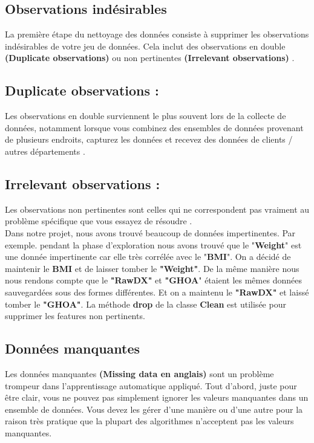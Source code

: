 \documentclass[12pt, french]{report}
\begin{document}
\subsection{Observations indésirables} La première étape du nettoyage des données consiste à supprimer les observations indésirables de votre jeu de données. Cela inclut des observations en double \textbf{(Duplicate observations)} ou non pertinentes \textbf{(Irrelevant observations)} \cite{key21}.

\subsection{Duplicate observations :} Les observations en double surviennent le plus souvent lors de la collecte de données, notamment lorsque vous combinez des ensembles de données provenant de plusieurs endroits, capturez les données et recevez des données de clients / autres départements \cite{key21}.

\subsection{Irrelevant observations :} Les observations non pertinentes sont celles qui ne correspondent pas vraiment au problème spécifique que vous essayez de résoudre \cite{key21}. \\

Dans notre projet, nous avons trouvé beaucoup de données impertinentes. Par exemple. pendant la phase d'exploration nous avons trouvé que le "\textbf{Weight}" est une donnée impertinente car elle très corrélée avec le "\textbf{BMI}". On a décidé de maintenir le \textbf{BMI} et de laisser tomber le \textbf{"Weight"}.  De la même manière nous nous rendons compte que le \textbf{"RawDX"} et \textbf{"GHOA}" étaient les mêmes données sauvegardées sous des formes différentes. Et on a maintenu le \textbf{"RawDX"} et laissé tomber le \textbf{"GHOA"}. La méthode \textbf{drop} de la classe \textbf{Clean} est utilisée pour supprimer les features non pertinents.  

\subsection{Données manquantes}
Les données manquantes \textbf{(Missing data en anglais)} sont un problème trompeur dans l'apprentissage automatique appliqué. Tout d'abord, juste pour être clair, vous ne pouvez pas simplement ignorer les valeurs manquantes dans un ensemble de données. Vous devez les gérer d'une manière ou d'une autre pour la raison très pratique que la plupart des algorithmes n'acceptent pas les valeurs manquantes.\\
\end{document}
